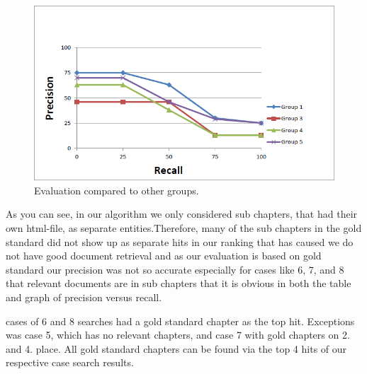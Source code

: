 \begin{figure}[h]
\caption{Evaluation compared to other groups.}
\centering
\includegraphics[scale=0.75]{evaluation_and_discussion/TotalEval.png}
\end{figure}

As you can see, in our algorithm we only considered sub chapters, that had their own html-file, as separate entities.Therefore, many of the sub chapters in the gold standard did not show up as separate hits in our ranking that has caused we do not have good document retrieval and as our evaluation is based on gold standard our precision was not so accurate especially for cases like 6, 7, and 8 that relevant documents are in sub chapters that it is obvious in both the table and graph of precision versus recall.

cases of 6 and 8  searches had a gold standard chapter as the top hit. Exceptions was case 5, which has no relevant chapters, and case 7 with gold chapters on 2. and 4. place. All gold standard chapters can be found via the top  4 hits of our respective case search results.